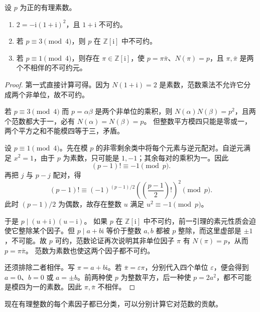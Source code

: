 \begin{proposition}\label{b3:prop:24-gaussian-primes}
设 \(p\) 为正的有理素数。
\begin{enumerate}
\item \(2=-\mathrm{i}(1+\mathrm{i})^2\)，且 \(1+\mathrm{i}\) 不可约。
\item 若 \(p\equiv3\pmod4\)，则 \(p\) 在 \(\mathbb Z[\mathrm{i}]\) 中不可约。
\item 若 \(p\equiv1\pmod4\)，则存在 \(\pi\in\mathbb Z[\mathrm{i}]\)，使
\(p=\pi\bar\pi\)、\(N(\pi)=p\)，且 \(\pi,\bar\pi\) 是两个不相伴的不可约元。
\end{enumerate}
\end{proposition}
\begin{proof}
第一式直接计算可得。因为 \(N(1+\mathrm{i})=2\) 是素数，范数乘法不允许它分成两个非单位，故不可约。

若 \(p\equiv3\pmod4\) 而 \(p=\alpha\beta\) 是两个非单位的乘积，则
\(N(\alpha)N(\beta)=p^2\)，且两个范数都大于一，必有 \(N(\alpha)=N(\beta)=p\)。
但整数平方模四只能是零或一，两个平方之和不能模四等于三，矛盾。

设 \(p\equiv1\pmod4\)。先在模 \(p\) 的非零剩余类中将每个元素与逆元配对。自逆元满足 \(x^2=1\)，由于 \(p\) 为素数，只可能是 \(1,-1\)；其余每对的乘积为一。因此
\[
(p-1)!\equiv-1\pmod p.
\]
再把 \(j\) 与 \(p-j\) 配对，得
\[
(p-1)!\equiv(-1)^{(p-1)/2}
  \left(\left(\frac{p-1}{2}\right)!\right)^2\pmod p.
\]
此时 \((p-1)/2\) 为偶数，故存在整数 \(u\) 满足 \(u^2\equiv-1\pmod p\)。

于是 \(p\mid(u+\mathrm{i})(u-\mathrm{i})\)。
如果 \(p\) 在 \(\mathbb Z[\mathrm{i}]\) 中不可约，前一引理的素元性质会迫使它整除某个因子。但 \(p\mid a+b\mathrm{i}\) 等价于整数 \(a,b\) 都被 \(p\) 整除，而这里虚部是 \(\pm1\)，不可能。故 \(p\) 可约，范数论证再次说明其非单位因子 \(\pi\) 有 \(N(\pi)=p\)，从而 \(p=\pi\bar\pi\)。
范数为素数也使这两个因子都不可约。

还须排除二者相伴。写 \(\pi=a+b\mathrm{i}\)。若 \(\bar\pi=\varepsilon\pi\)，分别代入四个单位 \(\varepsilon\)，便会得到 \(a=0\)、\(b=0\) 或 \(a=\pm b\)。前两种使 \(p\) 为整数平方，后一种使 \(p=2a^2\)，都不可能是模四为一的素数。因此 \(\pi,\bar\pi\) 不相伴。
\end{proof}

现在有理整数的每个素因子都已分类，可以分别计算它对范数的贡献。

